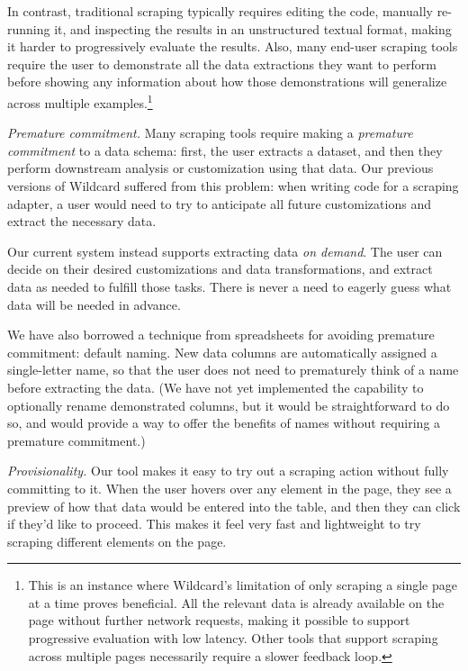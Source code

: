 \documentclass[sigconf,10pt]{acmart}
\begin{document}
In contrast, traditional scraping typically requires editing the code,
manually re-running it, and inspecting the results in an unstructured
textual format, making it harder to progressively evaluate the results.
Also, many end-user scraping tools \citep{chasins2018, lin2009} require
the user to demonstrate all the data extractions they want to perform
before showing any information about how those demonstrations will
generalize across multiple examples.\footnote{This is an instance where
  Wildcard's limitation of only scraping a single page at a time proves
  beneficial. All the relevant data is already available on the page
  without further network requests, making it possible to support
  progressive evaluation with low latency. Other tools that support
  scraping across multiple pages necessarily require a slower feedback
  loop.}

\emph{Premature commitment.} Many scraping tools require making a
\emph{premature commitment} to a data schema: first, the user extracts a
dataset, and then they perform downstream analysis or customization
using that data. Our previous versions of Wildcard suffered from this
problem: when writing code for a scraping adapter, a user would need to
try to anticipate all future customizations and extract the necessary
data.

Our current system instead supports extracting data \emph{on demand}.
The user can decide on their desired customizations and data
transformations, and extract data as needed to fulfill those tasks.
There is never a need to eagerly guess what data will be needed in
advance.

We have also borrowed a technique from spreadsheets for avoiding
premature commitment: default naming. New data columns are automatically
assigned a single-letter name, so that the user does not need to
prematurely think of a name before extracting the data. (We have not yet
implemented the capability to optionally rename demonstrated columns,
but it would be straightforward to do so, and would provide a way to
offer the benefits of names without requiring a premature commitment.)

\emph{Provisionality.} Our tool makes it easy to try out a scraping
action without fully committing to it. When the user hovers over any
element in the page, they see a preview of how that data would be
entered into the table, and then they can click if they'd like to
proceed. This makes it feel very fast and lightweight to try scraping
different elements on the page.
\end{document}
